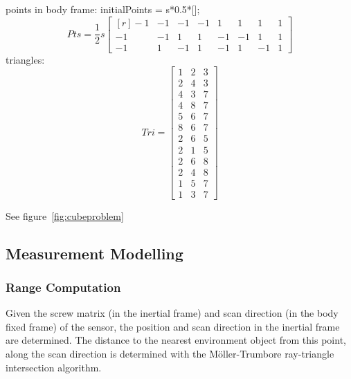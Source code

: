 points in body frame:
initialPoints = s*0.5*[];
\begin{equation}
	Pts = \frac{1}{2}s
	\begin{bmatrix*}[r]
		-1  &  -1  &  -1  &  -1  &   1  &   1  &   1  &  1 \\
		-1  &  -1  &   1  &   1  &  -1  &  -1  &   1  &  1 \\
		-1  &   1  &  -1  &   1  &  -1  &   1  &  -1  &  1 
	\end{bmatrix*}
\end{equation}
triangles:
\begin{equation}
	Tri = 
	\begin{bmatrix}
	1 & 2 & 3 \\
	2 & 4 & 3 \\
    4 & 3 & 7 \\
    4 & 8 & 7 \\
    5 & 6 & 7 \\
    8 & 6 & 7 \\
    2 & 6 & 5 \\
    2 & 1 & 5 \\
    2 & 6 & 8 \\
    2 & 4 & 8 \\
    1 & 5 & 7 \\
    1 & 3 & 7
	\end{bmatrix}
\end{equation}

See figure~\ref{fig:cubeproblem}


\subsection{Measurement Modelling}
	\subsubsection{Range Computation}
	Given the screw matrix (in the inertial frame) and scan direction (in the body fixed frame) of the sensor, the position and scan direction in the inertial frame are determined.
	The distance to the nearest environment object from this point, along the scan direction is determined with the M{\"o}ller-Trumbore ray-triangle intersection algorithm.

